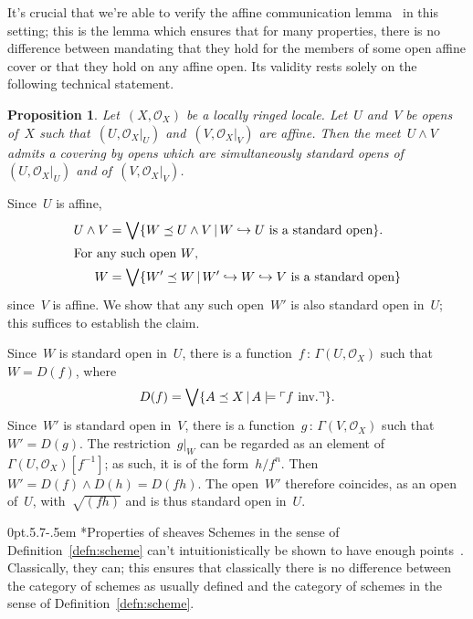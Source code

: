 \documentclass[10pt,reqno,a4paper]{amsbook}
\makeatletter
\theoremstyle{definition}
\theoremstyle{plain}
\newtheorem{prop}[defn]{Proposition}
\theoremstyle{remark}
\renewcommand{\O}{\mathcal{O}}
\newcommand{\?}{\,{:}\,}
\renewcommand{\_}{\mathpunct{.}\,}
\newcommand{\speak}[1]{\ulcorner\text{\textnormal{#1}}\urcorner}
\newcommand{\inv}{inv.\@}
\renewenvironment{proof}[1][\proofname]{\par
  \pushQED{\qed}%
  \normalfont \topsep6\p@\@plus6\p@\relax
  \trivlist
  \item[\hskip\labelsep
        \itshape
    #1\@addpunct{.}]\ignorespaces
}{%
  \popQED\endtrivlist\@endpefalse
}
\def\subsection{\@startsection{subsection}{2}%
  {0pt}{.5\linespacing\@plus.7\linespacing}{-.5em}%
  {\normalfont\bfseries}}
\makeatother
\begin{document}
{It's crucial that we're able to verify the affine communication
lemma~\cite[Lemma~5.3.2]{vakil:foag} in this setting; this is the lemma which
ensures that for many properties, there is no difference between mandating that
they hold for the members of some open affine cover or that they hold on any
affine open. Its validity rests solely on the following technical statement.

\begin{prop}Let~$(X,\O_X)$ be a locally ringed locale. Let~$U$ and~$V$ be opens of~$X$
such that~$(U,\O_X|_U)$ and~$(V,\O_X|_V)$ are affine. Then the meet~$U \wedge
V$ admits a covering by opens which are simultaneously standard opens
of~$(U,\O_X|_U)$ and of~$(V,\O_X|_V)$.
\end{prop}

\begin{proof}Since~$U$ is affine,
\begin{align*}
  U \wedge V &= \bigvee \{ W \preceq U \wedge V \,|\,
  \text{$W \hookrightarrow U$ is a standard open} \}. \\
\intertext{For any such open~$W$,}
  W &= \bigvee \{ W' \preceq W \,|\,
  \text{$W' \hookrightarrow W \hookrightarrow V$ is a standard open} \}
\end{align*}
since~$V$ is affine. We show that any such open~$W'$ is also standard open
in~$U$; this suffices to establish the claim.

Since~$W$ is standard open in~$U$, there is a function~$f \? \Gamma(U,\O_X)$
such that~$W = D(f)$, where
\[ D(f) = \bigvee \{ A \preceq X \,|\, A \models \speak{$f$ \inv} \}. \]
Since~$W'$ is standard open in~$V$, there is a function~$g \? \Gamma(V,\O_X)$
such that~$W' = D(g)$. The restriction~$g|_W$ can be regarded
as an element of~$\Gamma(U,\O_X)[f^{-1}]$; as such, it is of the form~$h/f^n$.
Then~$W' = D(f) \wedge D(h) = D(fh)$. The
open~$W'$ therefore coincides, as an open of~$U$, with~$\sqrt{(fh)}$ and is thus
standard open in~$U$.
\end{proof}


\subsection*{Properties of sheaves} Schemes in the sense of
Definition~\ref{defn:scheme} can't intuitionistically be shown to have enough
points~\cite{tierney:spectrum}. Classically, they can; this ensures that
classically there is no difference between the category of schemes as usually
defined and the category of schemes in the sense of
Definition~\ref{defn:scheme}.

}
\end{document}
